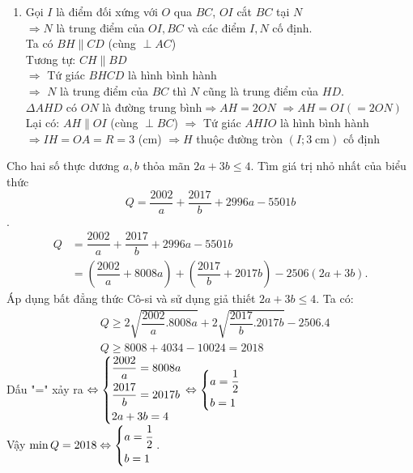 \begin{ex}
{\begin{enumerate}
         \item Gọi $I$ là điểm đối xứng với $O$ qua $BC$, $OI$ cắt $BC$ tại $N$\\
          $\Rightarrow N$ là trung điểm của $OI, BC$ và các điểm $I,N$ cố định.\\
         Ta có $BH\parallel CD$ (cùng $\perp AC$)\\
         Tương tự: $CH\parallel BD$\\
         $\Rightarrow $ Tứ giác $BHCD$ là hình bình hành\\
         $\Rightarrow $ $N$ là trung điểm của $BC$ thì $N$ cũng là trung điểm của $HD$.\\
         $\Delta AHD$ có $ON$ là đường trung bình$\Rightarrow AH=2ON$ $\Rightarrow AH=OI\left(=2ON\right)$\\
         Lại có: $AH\parallel OI$ (cùng $\perp BC$)
         $\Rightarrow $ Tứ giác $AHIO$ là hình bình hành\\
         $\Rightarrow IH=OA=R=3$ (cm)
         $\Rightarrow H$ thuộc đường tròn $\left(I;3\;\text{cm}\right)$ cố định  
    \end{enumerate}
}
\end{ex}

\begin{ex}%
   \hfill\par
    Cho hai số thực dương $a,b$ thỏa mãn $2a+3b\le 4$. Tìm giá trị nhỏ nhất của biểu thức $$Q=\dfrac{2002}{a}+\dfrac{2017}{b}+2996a-5501b$$.
\loigiai
    {\begin{align*}
    Q&=\dfrac{2002}{a}+\dfrac{2017}{b}+2996a-5501b\\
    &=\left(\dfrac{2002}{a}+8008a\right)+\left(\dfrac{2017}{b}+2017b\right)-2506\left(2a+3b\right).
    \end{align*}
    Áp dụng bất đẳng thức Cô-si và sử dụng giả thiết $2a+3b\le 4$. Ta có:
    {\begin{align*}
    &Q\ge 2\sqrt{\dfrac{2002}{a}.8008a}+2\sqrt{\dfrac{2017}{b}.2017b}-2506.4\\
    &Q\ge 8008+4034-10024=2018
     \end{align*}
    Dấu "=" xảy ra $\Leftrightarrow \left\{\begin{aligned}&\dfrac{2002}{a}=8008a\\&\dfrac{2017}{b}=2017b\\&2a+3b=4\end{aligned}\right.\Leftrightarrow \left\{\begin{aligned}&a=\dfrac{1}{2}\\&b=1\end{aligned}\right.$\\
    Vậy $\min Q=2018\Leftrightarrow \left\{\begin{aligned}&a=\dfrac{1}{2}\\&b=1\end{aligned}\right.$.
    }
    }
\end{ex}
